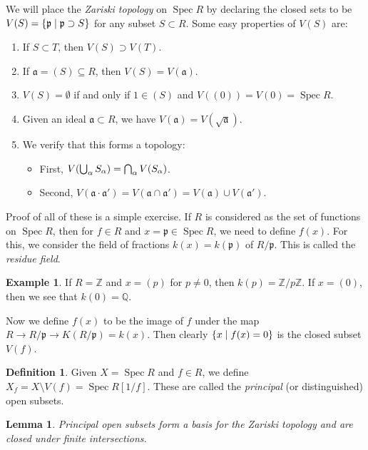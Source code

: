 \documentclass[leqno, openany]{memoir}
\newtheorem{lem}[thm]{Lemma}
\theoremstyle{definition}
\newtheorem{defn}[thm]{Definition}
\newtheorem{exm}[thm]{Example}
\theoremstyle{remark}
\theoremstyle{plain}
\theoremstyle{definition}
\theoremstyle{remark}
\newcommand{\Z}{\mathbb{Z}}
\newcommand{\Q}{\mathbb{Q}}
\newcommand{\mf}[1]{\mathfrak{#1}}
\DeclareMathOperator{\Spec}{Spec}
\begin{document}
We will place the \textit{Zariski topology} on $\Spec R$ by declaring the closed sets to be $V(S) = \qty{\mf{p} \mid \mf{p} \supset S}$ for any subset $S \subset R$. Some easy properties of $V(S)$ are:
\begin{enumerate}
    \item If $S \subset T$, then $V(S) \supset V(T)$.
    \item If $\mf{a} = (S) \subseteq R$, then $V(S) = V(\mf{a})$.
    \item $V(S) = \emptyset$ if and only if $1 \in (S)$ and $V((0)) = V(\qty{0}) = \Spec R$.
    \item Given an ideal $\mf{a} \subset R$, we have $V(\mf{a}) = V(\sqrt{\mf{a}})$.
    \item We verify that this forms a topology:
        \begin{itemize}
            \item First, $V\qty(\bigcup_{\alpha} S_{\alpha}) = \bigcap_{\alpha} V(S_{\alpha})$.
            \item Second, $V(\mf{a} \cdot \mf{a}') = V(\mf{a} \cap \mf{a}') = V(\mf{a}) \cup V(\mf{a}')$.
        \end{itemize}
\end{enumerate}

Proof of all of these is a simple exercise. If $R$ is considered as the set of functions on $\Spec R$, then for $f \in R$ and $x = \mf{p} \in \Spec R$, we need to define $f(x)$. For this, we consider the field of fractions $k(x) = k(\mf{p})$ of $R/\mf{p}$. This is called the \textit{residue field}. 

\begin{exm}
    If $R = \Z$ and $x = (p)$ for $p \neq 0$, then $k(p) = \Z/p\Z$. If $x = (0)$, then we see that $k(0) = \Q$.
\end{exm}

Now we define $f(x)$ to be the image of $f$ under the map $R \to R/\mf{p} \to K(R/\mf{p}) = k(x)$. Then clearly $\qty{x \mid f(x) = 0}$ is the closed subset $V(f)$.

\begin{defn}
    Given $X = \Spec R$ and $f \in R$, we define $X_f = X \setminus V(f) = \Spec R[1/f]$. These are called the \textit{principal} (or distinguished) open subsets. 
\end{defn}

\begin{lem}
    Principal open subsets form a basis for the Zariski topology and are closed under finite intersections.
\end{lem}
\end{document}
